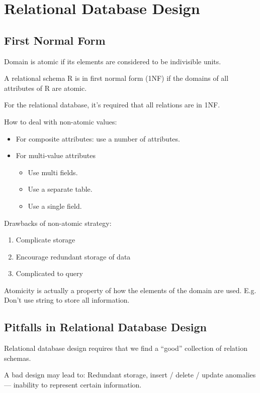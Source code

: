 \newpage
\quad
\newpage
\section{Relational Database Design}

\subsection{First Normal Form}
Domain is atomic if its elements are considered to be indivisible units. 

\begin{definition}
    A relational schema R is in first normal form (1NF) if the domains of all attributes of R are atomic.
\end{definition}

For the relational database, it’s required that all relations are in 1NF.

How to deal with non-atomic values:
\begin{itemize}\small
    \item For composite attributes: use a number of attributes.
    \item For multi-value attributes
    \begin{itemize}
        \item Use multi fields.
        \item Use a separate table.
        \item Use a single field.
    \end{itemize}
\end{itemize}

Drawbacks of non-atomic strategy:
\begin{enumerate}\small
    \item Complicate storage
    \item Encourage redundant storage of data
    \item Complicated to query
\end{enumerate}

Atomicity is actually a property of how the elements of the domain are used. E.g. Don't use string to store all information. 

\subsection{Pitfalls in Relational Database Design}
Relational database design requires that we find a ``good'' collection of relation schemas.

A bad design may lead to: Redundant storage, insert / delete / update anomalies --- inability to represent certain information.


